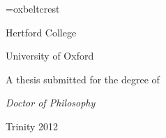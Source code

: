 

\font\beltcrestfont=oxbeltcrest
\def\beltcrest{{\beltcrestfont \char0}}

\newcommand{\submittedtext}{{A thesis submitted for the degree of}}
\newcommand{\degreedate}{Trinity 2012}
\newcommand{\degree}{Doctor of Philosophy}
\newcommand{\college}{Hertford College}


{%
\thispagestyle{plain}

\null\vfill
\begin{center}
{\Huge {\bfseries {\makeatletter\@title\makeatother}} \par}
{\large \vspace*{25mm} {\beltcrest \par} \vspace*{25mm}}
{{\Large \makeatletter\@author\makeatother} \par}
{\large \vspace*{1ex}
{{\college} \par}
\vspace*{1ex}
{University of Oxford \par}
\vspace*{20mm}
{{\submittedtext} \par}
\vspace*{1ex}
{\it {\degree} \par}
\vspace*{2ex}
{\degreedate}}
\end{center}
\null\vfill

\cleardoublepage}


